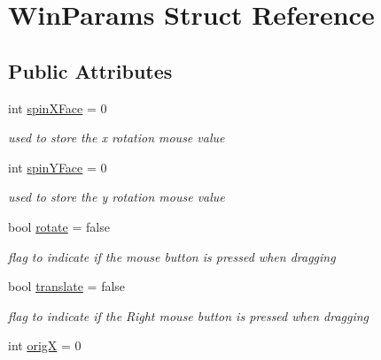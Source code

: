 \hypertarget{struct_win_params}{\section{Win\-Params Struct Reference}
\label{struct_win_params}
}
\subsection*{Public Attributes}
\begin{DoxyCompactItemize}
\item 
\hypertarget{struct_win_params_ae834d382a91e06699778caf8abf8b6a0}{int \hyperlink{struct_win_params_ae834d382a91e06699778caf8abf8b6a0}{spin\-X\-Face} = 0}\label{struct_win_params_ae834d382a91e06699778caf8abf8b6a0}

\begin{DoxyCompactList}\small\item\em used to store the x rotation mouse value \end{DoxyCompactList}\item 
\hypertarget{struct_win_params_adf538a60ecec846bb85fb790cdf02ef6}{int \hyperlink{struct_win_params_adf538a60ecec846bb85fb790cdf02ef6}{spin\-Y\-Face} = 0}\label{struct_win_params_adf538a60ecec846bb85fb790cdf02ef6}

\begin{DoxyCompactList}\small\item\em used to store the y rotation mouse value \end{DoxyCompactList}\item 
\hypertarget{struct_win_params_a255e3c376110315e2a4ff63ccc312360}{bool \hyperlink{struct_win_params_a255e3c376110315e2a4ff63ccc312360}{rotate} = false}\label{struct_win_params_a255e3c376110315e2a4ff63ccc312360}

\begin{DoxyCompactList}\small\item\em flag to indicate if the mouse button is pressed when dragging \end{DoxyCompactList}\item 
\hypertarget{struct_win_params_adcfa86195240b478c94bfecc5e33e8e7}{bool \hyperlink{struct_win_params_adcfa86195240b478c94bfecc5e33e8e7}{translate} = false}\label{struct_win_params_adcfa86195240b478c94bfecc5e33e8e7}

\begin{DoxyCompactList}\small\item\em flag to indicate if the Right mouse button is pressed when dragging \end{DoxyCompactList}\item 
\hypertarget{struct_win_params_ab9ddf234ba11eb4460eb48469cd73c3a}{int \hyperlink{struct_win_params_ab9ddf234ba11eb4460eb48469cd73c3a}{orig\-X} = 0}\label{struct_win_params_ab9ddf234ba11eb4460eb48469cd73c3a}


\end{DoxyCompactItemize}
